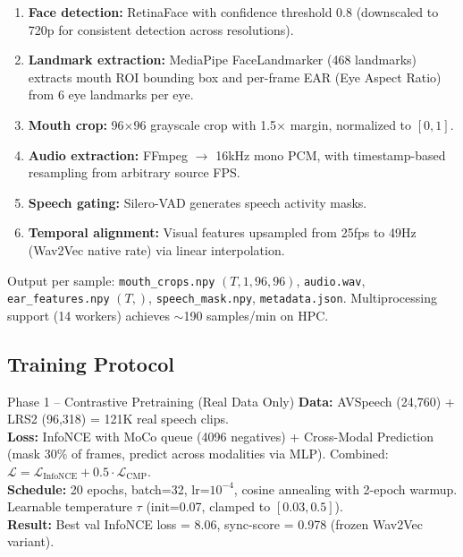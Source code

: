 \documentclass[12pt, letterpaper]{article}
\begin{document}
\begin{enumerate}[itemsep=2pt, leftmargin=1.5em]
    \item \textbf{Face detection:} RetinaFace with confidence threshold 0.8 (downscaled to 720p for consistent detection across resolutions).
    \item \textbf{Landmark extraction:} MediaPipe FaceLandmarker (468 landmarks) extracts mouth ROI bounding box and per-frame EAR (Eye Aspect Ratio) from 6 eye landmarks per eye.
    \item \textbf{Mouth crop:} 96$\times$96 grayscale crop with 1.5$\times$ margin, normalized to $[0, 1]$.
    \item \textbf{Audio extraction:} FFmpeg $\to$ 16kHz mono PCM, with timestamp-based resampling from arbitrary source FPS.
    \item \textbf{Speech gating:} Silero-VAD generates speech activity masks.
    \item \textbf{Temporal alignment:} Visual features upsampled from 25fps to 49Hz (Wav2Vec native rate) via linear interpolation.
\end{enumerate}

Output per sample: \texttt{mouth\_crops.npy} $(T, 1, 96, 96)$, \texttt{audio.wav}, \texttt{ear\_features.npy} $(T,)$, \texttt{speech\_mask.npy}, \texttt{metadata.json}. Multiprocessing support (14 workers) achieves $\sim$190 samples/min on HPC.

\subsection{Training Protocol}

\begin{infobox}{Phase 1 -- Contrastive Pretraining (Real Data Only)}
\textbf{Data:} AVSpeech (24,760) + LRS2 (96,318) = 121K real speech clips.\\
\textbf{Loss:} InfoNCE with MoCo queue (4096 negatives) + Cross-Modal Prediction (mask 30\% of frames, predict across modalities via MLP). Combined: $\mathcal{L} = \mathcal{L}_\text{InfoNCE} + 0.5 \cdot \mathcal{L}_\text{CMP}$.\\
\textbf{Schedule:} 20 epochs, batch=32, lr=$10^{-4}$, cosine annealing with 2-epoch warmup. Learnable temperature $\tau$ (init=0.07, clamped to $[0.03, 0.5]$).\\
\textbf{Result:} Best val InfoNCE loss = 8.06, sync-score = 0.978 (frozen Wav2Vec variant).
\end{infobox}
\end{document}
